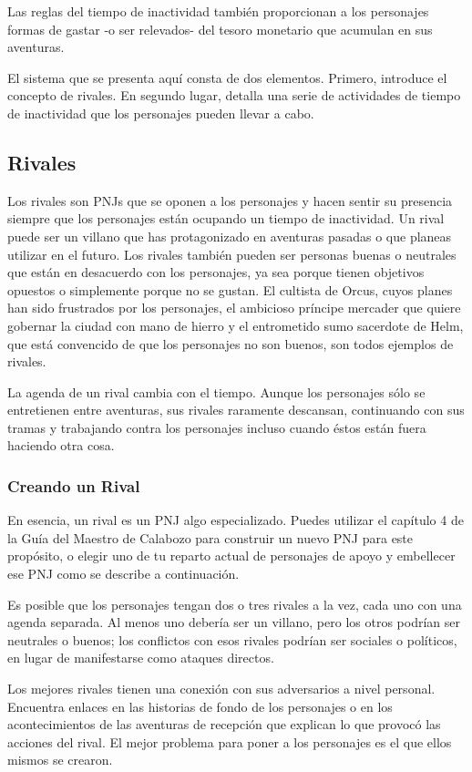 \documentclass[a4paper,twocolumn,openany,10pt]{dndbook}
\begin{document}
Las reglas del tiempo de inactividad también proporcionan a los personajes formas de gastar -o ser relevados- del tesoro
monetario que acumulan en sus aventuras.

El sistema que se presenta aquí consta de dos elementos. Primero, introduce el concepto de rivales. En segundo lugar, detalla
una serie de actividades de tiempo de inactividad que los personajes pueden llevar a cabo. 

\subsection{Rivales}
Los rivales son PNJs que se oponen a los personajes y hacen sentir su presencia siempre que los personajes están ocupando un
tiempo de inactividad. Un rival puede ser un villano que has protagonizado en aventuras pasadas o que planeas utilizar en el
futuro. Los rivales también pueden ser personas buenas o neutrales que están en desacuerdo con los personajes, ya sea porque
tienen objetivos opuestos o simplemente porque no se gustan. El cultista de Orcus, cuyos planes han sido frustrados por los
personajes, el ambicioso príncipe mercader que quiere gobernar la ciudad con mano de hierro y el entrometido sumo sacerdote de
Helm, que está convencido de que los personajes no son buenos, son todos ejemplos de rivales.

La agenda de un rival cambia con el tiempo. Aunque los personajes sólo se entretienen entre aventuras, sus rivales raramente
descansan, continuando con sus tramas y trabajando contra los personajes incluso cuando éstos están fuera haciendo otra cosa.

\subsubsection*{Creando un Rival}
En esencia, un rival es un PNJ algo especializado. Puedes utilizar el capítulo 4 de la Guía del Maestro de Calabozo para
construir un nuevo PNJ para este propósito, o elegir uno de tu reparto actual de personajes de apoyo y embellecer ese PNJ como
se describe a continuación.

Es posible que los personajes tengan dos o tres rivales a la vez, cada uno con una agenda separada. Al menos uno debería ser un
villano, pero los otros podrían ser neutrales o buenos; los conflictos con esos rivales podrían ser sociales o políticos, en
lugar de manifestarse como ataques directos.

Los mejores rivales tienen una conexión con sus adversarios a nivel personal. Encuentra enlaces en las historias de fondo de los
personajes o en los acontecimientos de las aventuras de recepción que explican lo que provocó las acciones del rival. El mejor
problema para poner a los personajes es el que ellos mismos se crearon. 
\end{document}
